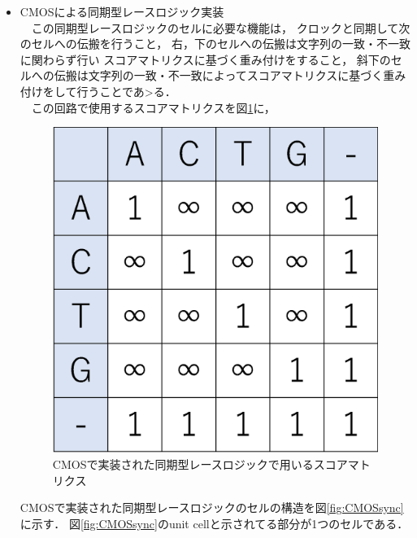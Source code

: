 \begin{itemize}
\item CMOSによる同期型レースロジック実装\\
\ \ この同期型レースロジックのセルに必要な機能は，
クロックと同期して次のセルへの伝搬を行うこと，
右，下のセルへの伝搬は文字列の一致・不一致に関わらず行い
スコアマトリクスに基づく重み付けをすること，
斜下のセルへの伝搬は文字列の一致・不一致によってスコアマトリクスに基づく重み付けをして行うことであ>る．\\
\ \ この回路で使用するスコアマトリクスを図\ref{fig:scoresync}に，
\begin{figure}[t!]
\begin{center}
\includegraphics[keepaspectratio,scale=0.4]{fig/2/CMOSsyncscore.eps}
\caption{CMOSで実装された同期型レースロジックで用いるスコアマトリクス}
\label{fig:scoresync}
\end{center}
\end{figure}
CMOSで実装された同期型レースロジックのセルの構造を図\ref{fig:CMOSsync}に示す．
図\ref{fig:CMOSsync}のunit cellと示されてる部分が1つのセルである．\\
\begin{figure}[t!]
\begin{center}

\end{center}
\end{figure}
\end{itemize}

